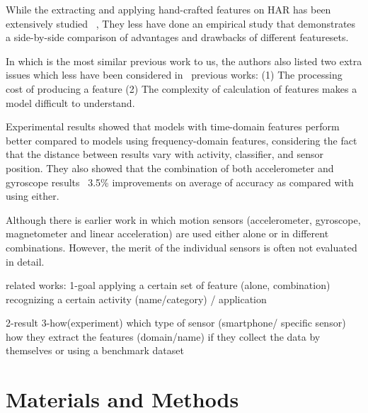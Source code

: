 \documentclass[journal,article,submit,moreauthors,pdftex]{Definitions/mdpi}
\begin{document}
While the extracting and applying hand-crafted features on HAR has been extensively studied ~\cite{wang2019survey,janidarmian2017comprehensive}, They less have done an empirical study that demonstrates a side-by-side comparison of advantages and drawbacks of different featuresets.

In \cite{rosati2018comparison} which is the most similar previous work to us, the authors also listed two extra issues which less have been considered in \
previous works:
(1) The processing cost of producing a feature
(2) The complexity of calculation of features makes a model difficult to understand.



\cite{s140610146}Experimental results showed that models with time-domain features perform better compared to models using frequency-domain features, considering the fact that the distance between results vary with activity, classifier, and sensor position. They also showed that the combination of both accelerometer and gyroscope results ~3.5\% improvements on average of accuracy as compared with using either.




Although there is earlier work in which motion sensors (accelerometer, gyroscope, magnetometer and linear acceleration) are used either alone or in different combinations. However, the merit of the individual sensors is often not evaluated in detail.


related works: 
1-goal
	applying a certain set of feature (alone, combination) 
	recognizing a certain activity (name/category) / application
	
 2-result
 3-how(experiment)
	which type of sensor (smartphone/ specific sensor)
	how they extract the features (domain/name)
	if they collect the data by themselves or using a benchmark dataset
	

\section{Materials and Methods}

\end{document}

